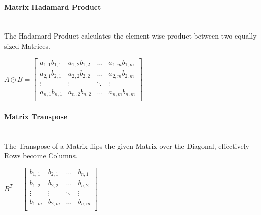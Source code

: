 \begin{flushleft}
                \paragraph{Matrix Hadamard Product} \mbox{} \\
                    \vspace{0.2cm}
                    The Hadamard Product calculates the element-wise product between two equally sized Matrices. \\

                    \begin{center}
                        $
                        A \odot B =
                        \begin{bmatrix}
                            a_{1,1}b_{1,1} & a_{1,2}b_{1,2} & \hdots  & a_{1,m}b_{1,m} \\
                            a_{2,1}b_{2,1} & a_{2,2}b_{2,2} & \hdots  & a_{2,m}b_{2,m} \\
                            \vdots         & \vdots         & \ddots  & \vdots         \\
                            a_{n,1}b_{n,1} & a_{n,2}b_{n,2} & \hdots  & a_{n,m}b_{n,m} \\
                        \end{bmatrix}
                        $
                    \end{center}

                \paragraph{Matrix Transpose} \mbox{} \\
                    \vspace{0.2cm}
                    The Transpose of a Matrix flips the given Matrix over the Diagonal, effectively Rows become Columns. \\

                    \begin{center}
                        $
                        B^{T} = 
                        \begin{bmatrix}
                            b_{1,1} & b_{2,1} & \hdots  & b_{n,1} \\
                            b_{1,2} & b_{2,2} & \hdots  & b_{n,2} \\
                            \vdots  & \vdots  & \ddots  & \vdots  \\
                            b_{1,m} & b_{2,m} & \hdots  & b_{n,m} \\
                        \end{bmatrix}
                        $
                    \end{center}
                    

\end{flushleft}
